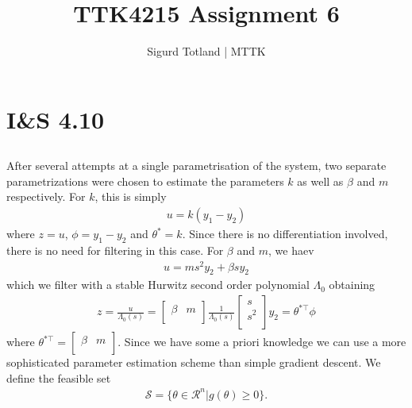 \documentclass[]{article}
\title{TTK4215 Assignment 6}
\author{Sigurd Totland | MTTK}
\begin{document}
\maketitle

\section{I\&S 4.10}
\setcounter{subsection}{2}
\subsection{}
After several attempts at a single parametrisation of the system, two separate parametrizations were chosen to estimate the parameters $k$ as well as $\beta$ and $m$ respectively. For $k$, this is simply
\begin{equation}\begin{aligned}
u = k(y_1 - y_2)
\end{aligned}\end{equation}
where $z = u$, $\phi = y_1 - y_2$ and $\theta^* = k$. Since there is no differentiation involved, there is no need for filtering in this case. For $\beta$ and $m$, we haev
\begin{equation}\begin{aligned}
u = ms^2y_2 + \beta s y_2
\end{aligned}\end{equation}
which we filter with a stable Hurwitz second order polynomial $\Lambda_0$ obtaining
\begin{equation}\begin{aligned}
z = \frac{u}{\Lambda_0(s)} =
\begin{bmatrix}
\beta & m \\
\end{bmatrix}
\frac{1}{\Lambda_0(s)}
\begin{bmatrix}
s \\
s^2\\
\end{bmatrix}
y_2
= \theta^{*\top}\phi
\end{aligned}\end{equation}
where $\theta^{*\top} = \begin{bmatrix} \beta & m \\ \end{bmatrix}$.
Since we have some a priori knowledge we can use a more sophisticated parameter estimation scheme than simple gradient descent. We define the feasible set
\begin{equation}\begin{aligned}
\mathcal{S} = \{\theta \in \mathcal{R}^n | g(\theta) \geq 0\}.
\end{aligned}\end{equation}
\end{document}
